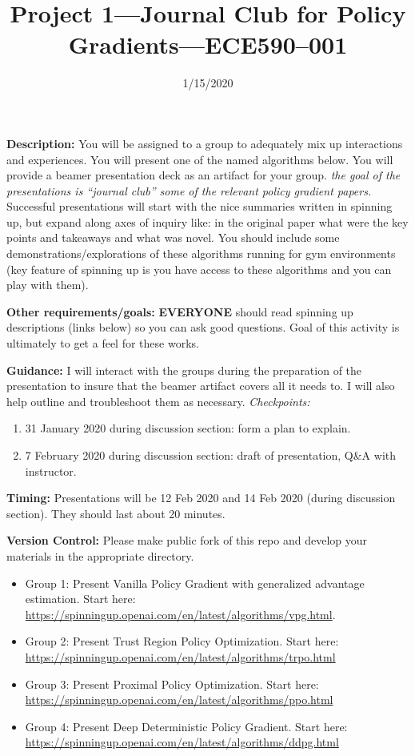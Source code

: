 \documentclass{article}
\title{Project 1---Journal Club for Policy Gradients---ECE590--001}
\date{1/15/2020}
\begin{document}
\maketitle

{\bf Description:} You will be assigned to a group to adequately mix up
interactions and experiences. You will present one of the named algorithms
below. You will provide a beamer presentation deck as an artifact for your
group. {\em the goal of the presentations is ``journal club'' some of the
relevant policy gradient papers.} Successful presentations will start with the
nice summaries written in spinning up, but expand along axes of inquiry like: in
the original paper what were the key points and takeaways and what was novel.
You should include some demonstrations/explorations of these algorithms running
for gym environments (key feature of spinning up is you have access to these
algorithms and you can play with them).

{\bf Other requirements/goals:} {\bf EVERYONE} should read spinning up
descriptions (links below) so you can ask good questions. Goal of this activity
is ultimately to get a feel for these works.

{\bf Guidance:} I will interact with the groups during the preparation of the
presentation to insure that the beamer artifact covers all it needs to. I will
also help outline and troubleshoot them as necessary. {\em Checkpoints:}
\begin{enumerate}
\item 31 January 2020 during discussion section: form a plan to explain.
\item 7 February 2020 during discussion section: draft of presentation, Q\&A
with instructor.
\end{enumerate}

{\bf Timing:} Presentations will be 12 Feb 2020 and 14 Feb 2020 (during
discussion section). They should last about 20 minutes.

{\bf Version Control:} Please make public fork of this repo and develop your
materials in the appropriate directory.

\begin{itemize}
\item Group 1: Present Vanilla Policy Gradient with generalized advantage estimation. Start here: \url{https://spinningup.openai.com/en/latest/algorithms/vpg.html}.
\item Group 2: Present Trust Region Policy Optimization. Start here: \url{https://spinningup.openai.com/en/latest/algorithms/trpo.html}
\item Group 3: Present Proximal Policy Optimization. Start here: \url{https://spinningup.openai.com/en/latest/algorithms/ppo.html}
\item Group 4: Present Deep Deterministic Policy Gradient. Start here: \url{https://spinningup.openai.com/en/latest/algorithms/ddpg.html}
\end{itemize}
\end{document}
